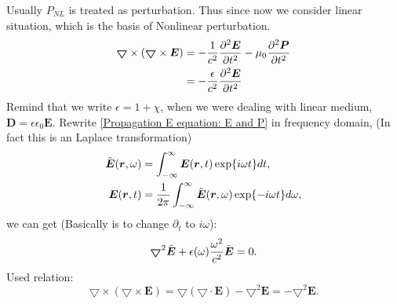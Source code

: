 \documentclass[12pt]{extarticle}
\numberwithin{equation}{section}
\numberwithin{figure}{section}
\numberwithin{table}{section}
\newcommand{\<}{\langle}
\renewcommand{\>}{\rangle}
\theoremstyle{definition}
\newcommand{\Lap}{\boldsymbol{\bigtriangledown}}
\begin{document}
        
        Usually $P_{NL}$ is treated as perturbation. Thus since now we consider linear situation, which is the basis of Nonlinear perturbation.
            \begin{equation}
                \begin{split}
                    \Lap \times (\Lap\times\boldsymbol{E}) &= -\frac{1}{c^2}\pdv[2]{\boldsymbol{E}}{t}-\mu_0\pdv[2]{\boldsymbol{P}}{t}\\
                    &=-\frac{\epsilon}{c^2}\pdv[2]{\boldsymbol{E}}{t}
                \end{split}
                \label{Propagation E equation: E and P}
            \end{equation}
        Remind that we write $\epsilon = 1 + \chi$, when we were dealing with linear medium, $\boldsymbol{D} = \epsilon\epsilon_0\boldsymbol{E}$. Rewrite \autoref{Propagation E equation: E and P} in frequency domain, (In fact this is an Laplace transformation)
            \begin{subequations}
                \label{E in time domain and frequency domain}
                \begin{align}
                    \Tilde{\boldsymbol{E}}(\boldsymbol{r},\omega) &= \int_{-\infty}^{\infty} \boldsymbol{E}(\boldsymbol{r},t)\exp{i\omega t}dt\label{From E in time domain to E in freq domain},\\
                    \boldsymbol{E}(\boldsymbol{r},t) &=\frac{1}{2\pi} \int_{-\infty}^{\infty} \Tilde{\boldsymbol{E}}(\boldsymbol{r},\omega)\exp{-i\omega t}d\omega ,\label{From E in freq domain to E in time domain}
                \end{align}
            \end{subequations}
        we can get (Basically is to change $\partial_t$ to $i\omega$):
            \begin{equation}
                \Lap^2\Tilde{\boldsymbol{E}}+\epsilon(\omega)\frac{\omega^2}{c^2}\Tilde{\boldsymbol{E}}=0.
                \label{Propagation E equation in freq domain}
            \end{equation}
        Used relation:
            \begin{equation}
                \Lap\times(\Lap\times\boldsymbol{E})=\Lap(\Lap\cdot\boldsymbol{E})-\Lap^2\boldsymbol{E}=-\Lap^2\boldsymbol{E}.
            \end{equation}
\end{document}
